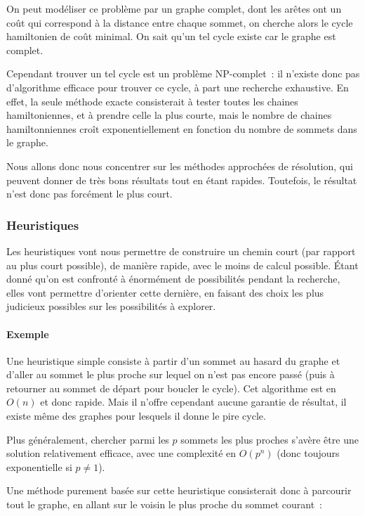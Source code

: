     On peut modéliser ce problème par un graphe complet, dont les arêtes ont un
    coût qui correspond à la distance entre chaque sommet, on cherche alors le
    cycle hamiltonien de coût minimal. On sait qu'un tel cycle existe car le
    graphe est complet.

    Cependant trouver un tel cycle est un problème NP-complet~: il n'existe
    donc pas d'algorithme efficace pour trouver ce cycle, à part une recherche
    exhaustive.
    En effet, la seule méthode exacte consisterait à tester toutes les chaines
    hamiltoniennes, et à prendre celle la plus courte, mais le nombre de chaines
    hamiltonniennes croît exponentiellement en fonction du nombre de sommets
    dans le graphe.

    Nous allons donc nous concentrer sur les méthodes approchées de résolution,
    qui peuvent donner de très bons résultats tout en étant rapides.
    Toutefois, le résultat n'est donc pas forcément le plus court.

  \subsubsection{Heuristiques}
    Les heuristiques vont nous permettre de construire un chemin court (par
    rapport au plus court possible), de manière rapide, avec le moins de calcul
    possible.  Étant donné qu'on est confronté à énormément de possibilités
    pendant la recherche, elles vont permettre d'orienter cette dernière, en
    faisant des choix les plus judicieux possibles sur les possibilités à
    explorer.

    \paragraph{Exemple} Une heuristique simple consiste à partir d'un sommet au
    hasard du graphe et d'aller au sommet le plus proche sur lequel on n'est
    pas encore passé (puis à retourner au sommet de départ pour boucler le
    cycle). Cet algorithme est en $O(n)$ et donc rapide. Mais il n'offre
    cependant aucune garantie de résultat, il existe même des graphes pour
    lesquels il donne le pire cycle.

    Plus généralement, chercher parmi les $p$ sommets les plus proches s'avère
    être une solution relativement efficace, avec une complexité en $O(p^n)$
    (donc toujours exponentielle si $p \neq 1$).

    Une méthode purement basée sur cette heuristique consisterait donc à parcourir
    tout le graphe, en allant sur le voisin le plus proche du sommet courant~:

